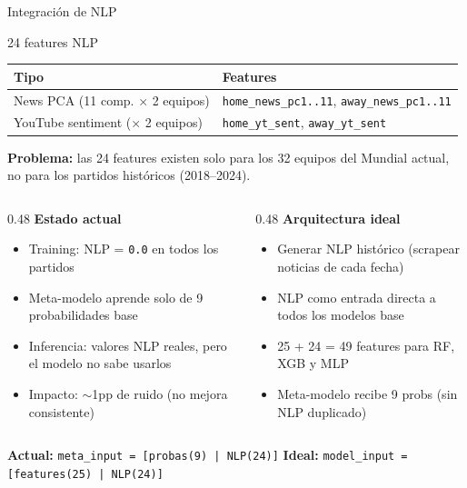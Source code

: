 \documentclass[aspectratio=169,10pt]{beamer}
\newcommand{\code}[1]{\texttt{#1}}
\begin{document}
\begin{frame}{Integración de NLP}

  \begin{exampleblock}{24 features NLP}
    \centering
    {\small
    \begin{tabular}{ll}
      \toprule
      \textbf{Tipo} & \textbf{Features} \\
      \midrule
      News PCA (11 comp. $\times$ 2 equipos) & \code{home\_news\_pc1..11}, \code{away\_news\_pc1..11} \\
      YouTube sentiment ($\times$ 2 equipos)  & \code{home\_yt\_sent}, \code{away\_yt\_sent} \\
      \bottomrule
    \end{tabular}
    }
  \end{exampleblock}

  \vspace{0.2cm}
  \textbf{Problema:} las 24 features existen solo para los 32 equipos
  del Mundial actual, no para los partidos históricos (2018--2024).

  \vspace{0.15cm}
  \begin{columns}[T]
    \begin{column}{0.48\textwidth}
      \textbf{Estado actual}
      \begin{itemize}\small
        \item Training: NLP = \texttt{0.0} en todos los partidos
        \item Meta-modelo aprende solo de 9 probabilidades base
        \item Inferencia: valores NLP reales, pero el modelo no sabe usarlos
        \item Impacto: $\sim$1pp de ruido (no mejora consistente)
      \end{itemize}
    \end{column}
    \begin{column}{0.48\textwidth}
      \textbf{Arquitectura ideal}
      \begin{itemize}\small
        \item Generar NLP histórico (scrapear noticias de cada fecha)
        \item NLP como entrada directa a \alert{todos} los modelos base
        \item 25 + 24 = 49 features para RF, XGB y MLP
        \item Meta-modelo recibe 9 probs (sin NLP duplicado)
      \end{itemize}
    \end{column}
  \end{columns}

  \vspace{0.15cm}
  \centering
  {\small\textbf{Actual:}\; \code{meta\_input = [probas(9) | NLP(24)]}
  \qquad
  \textbf{Ideal:}\; \code{model\_input = [features(25) | NLP(24)]}}
\end{frame}
\end{document}
